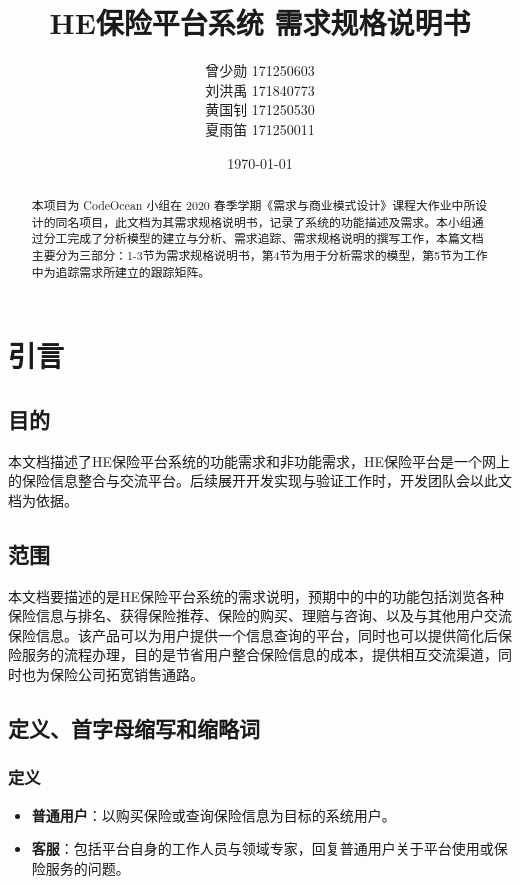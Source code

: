 \documentclass[a4paper]{ctexart}
\title{HE保险平台系统 需求规格说明书}
\author{
  曾少勋 171250603\\
  刘洪禹 171840773\\
  黄国钊 171250530\\
  夏雨笛 171250011\\
}
\date{\today}
\begin{document}
\maketitle

\begin{abstract}
  本项目为 CodeOcean 小组在 2020 春季学期《需求与商业模式设计》课程大作业中所设计的同名项目，此文档为其需求规格说明书，记录了系统的功能描述及需求。本小组通过分工完成了分析模型的建立与分析、需求追踪、需求规格说明的撰写工作，本篇文档主要分为三部分：1-3节为需求规格说明书，第4节为用于分析需求的模型，第5节为工作中为追踪需求所建立的跟踪矩阵。
\end{abstract}

\tableofcontents

\newpage

\section{引言}

\subsection{目的}

本⽂档描述了HE保险平台系统的功能需求和⾮功能需求，HE保险平台是一个网上的保险信息整合与交流平台。后续展开开发实现与验证工作时，开发团队会以此⽂档为依据。

\subsection{范围}

本文档要描述的是HE保险平台系统的需求说明，预期中的中的功能包括浏览各种保险信息与排名、获得保险推荐、保险的购买、理赔与咨询、以及与其他用户交流保险信息。该产品可以为用户提供一个信息查询的平台，同时也可以提供简化后保险服务的流程办理，目的是节省用户整合保险信息的成本，提供相互交流渠道，同时也为保险公司拓宽销售通路。

\subsection{定义、首字母缩写和缩略词}
\subsubsection{定义}
\begin{itemize}
    \item \textbf{普通用户}：以购买保险或查询保险信息为目标的系统用户。
    \item \textbf{客服}：包括平台自身的工作人员与领域专家，回复普通用户关于平台使用或保险服务的问题。
\end{itemize}
\end{document}
